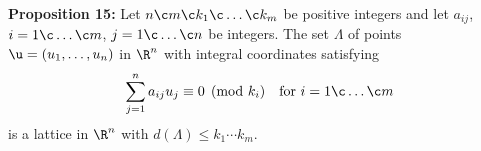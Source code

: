 \textbf{Proposition 15:}  Let $n\c m\c k_1\c \dotsc\c k_m$ be positive integers and let $a_{ij}$, $i=1\c \dotsc\c m$, $j=1\c \dotsc\c n$ be integers.  The set $\Lambda$ of points $\u=(u_1,\dotsc,u_n)$ in $\R^n$ with integral coordinates satisfying
\[ \sum_{j=1}^n a_{ij}u_j \equiv 0 \pmod{k_i} \quad\text{for $i=1\c \dotsc\c m$} \]
is a lattice in $\R^n$ with $d(\Lambda)\leq k_1\dotsm k_m$.
